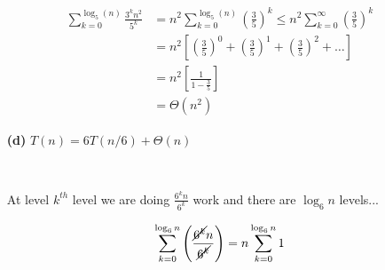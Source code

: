 \documentclass[12pt]{article}
\begin{document}
\begin{enumerate}
\begin{align*}
                \sum_{k = 0}^{\log_5(n)}\frac{3^kn^2}{5^k} &= n^2\sum_{k = 0}^{\log_5(n)}\left(\frac{3}{5}\right)^k \le n^2\sum_{k = 0}^{\infty}\left(\frac{3}{5}\right)^k\\
                &=n^2\left[\left(\frac{3}{5}\right)^0 + \left(\frac{3}{5}\right)^1 + \left(\frac{3}{5}\right)^2 + \dots\right]\\
                &= n^2\left[\frac{1}{1-\frac{3}{5}}\right]\\
                &=\boxed{\Theta\left(n^2\right)}
            \end{align*}
        \color{black}
        \item[\textbf{(d)}] $T(n) = 6T(n/6) + \Theta(n)$ \\
        \color{blue}
            \begin{center}
                 \\
            \end{center}
            \begin{center}
                At level $k^{th}$ level we are doing $\frac{6^kn}{6^k}$ work and there are $\log_6n$ levels...                
            \end{center}
            \begin{align*}
                \sum_{k=0}^{\log_6n} \left(\frac{\cancel{6^k}n}{\cancel{6^k}}\right) &= n\sum_{k=0}^{\log_6n}1\\

\end{align*}
\end{enumerate}
\end{document}
